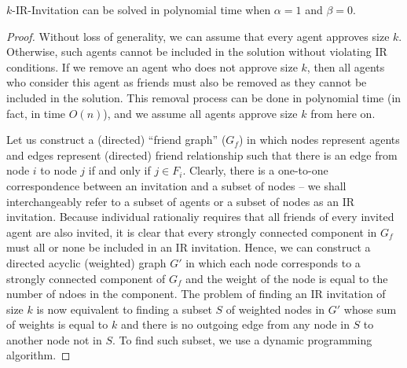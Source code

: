 \begin{theorem} \label{SIP:thm:easiness_IR_a1_b0}
	$k$-IR-Invitation can be solved in polynomial time when $\alpha =1$ and $\beta = 0$.
\end{theorem} 
\begin{proof}
Without loss of generality, we can assume that every agent approves size $k$. Otherwise, such agents cannot be included in the solution without violating IR conditions. If we remove an agent who does not approve size $k$, then all agents who consider this agent as friends must also be removed as they cannot be included in the solution. This removal process can be done in polynomial time (in fact, in time $O(n)$), and we assume all agents approve size $k$ from here on. 
	
	Let us construct a (directed) ``friend graph'' ($G_f$) in which nodes represent agents and edges represent (directed) friend relationship such that there is an edge from node $i$ to node $j$ if and only if $j \in F_i$. Clearly, there is a one-to-one correspondence between an invitation and a subset of nodes -- we shall interchangeably refer to a subset of agents or a subset of nodes as an IR invitation. Because individual rationaliy requires that all friends of every invited agent are also invited, it is clear that every strongly connected component in $G_f$ must all or none be included in an IR invitation. Hence, we can construct a directed acyclic (weighted) graph $G'$ in which each node corresponds to a strongly connected component of $G_f$ and the weight of the node is equal to the number of ndoes in the component. The problem of finding an IR invitation of size $k$ is now equivalent to finding a subset $S$ of weighted nodes in $G'$ whose sum of weights is equal to $k$ and there is no outgoing edge from any node in $S$ to another node not in $S$. To find such subset, we use a dynamic programming algorithm. 
	

\end{proof}
